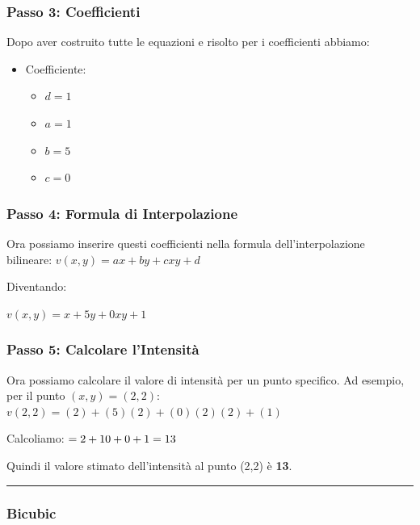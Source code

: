 \subsubsection{Passo 3: Coefficienti}\label{passo-3-coefficienti}

Dopo aver costruito tutte le equazioni e risolto per i coefficienti
abbiamo:

\begin{itemize}
\tightlist
\item
  Coefficiente:

  \begin{itemize}
  \tightlist
  \item
    \(d=1\)
  \item
    \(a=1\)
  \item
    \(b=5\)
  \item
    \(c=0\)
  \end{itemize}
\end{itemize}

\subsubsection{Passo 4: Formula di
Interpolazione}\label{passo-4-formula-di-interpolazione}

Ora possiamo inserire questi coefficienti nella formula
dell'interpolazione bilineare: \(v(x,y) = ax + by + cxy + d\)

Diventando:

\(v(x,y) = x + 5y + 0xy + 1\)

\subsubsection{Passo 5: Calcolare
l'Intensità}\label{passo-5-calcolare-lintensituxe0}

Ora possiamo calcolare il valore di intensità per un punto specifico. Ad
esempio, per il punto \((x,y)=(2,2)\):
\(v(2,2) = (2) + (5)(2) + (0)(2)(2) + (1)\)

Calcoliamo: \(= 2 + 10 + 0 + 1\\
= 13\)

Quindi il valore stimato dell'intensità al punto (2,2) è \textbf{13}.

\begin{center}\rule{0.5\linewidth}{0.5pt}\end{center}

\subsubsection{Bicubic}\label{bicubic}

